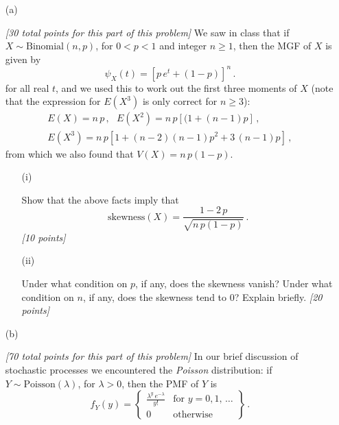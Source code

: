 \documentclass[12pt]{article}
\begin{document}
\begin{itemize}

\item[(a)]

\textit{[30 total points for this part of this problem]} We saw in class that if $X \sim \text{Binomial} ( n, p )$, for $0 < p < 1$ and integer $n \ge 1$, then the MGF of $X$ is given by
\begin{equation} \label{e:binomial-mgf-1}
\psi_X ( t ) = \left[ p \, e^t + ( 1 - p ) \right]^n \, .
\end{equation}
for all real $t$, and we used this to work out the first three moments of $X$ (note that the expression for $E \left( X^3 \right)$ is only correct for $n \ge 3$):
\begin{eqnarray} \label{e:binomial-mgf-2}
E ( X ) = n \, p \, , \ \ \ E \left( X^2 \right) = n \, p [ ( 1 + ( n - 1 ) p ] \, , \\ E \left( X^3 \right) = n \, p [ 1 + ( n - 2 ) ( n - 1 ) p^2 + 3 \, ( n - 1 ) p ] \, ,
\end{eqnarray}
from which we also found that $V ( X ) = n \, p ( 1 - p )$. 

\begin{itemize}

\item[(i)]%

Show that the above facts imply that
\begin{equation} \label{e:binomial-mgf-3}
\mbox{skewness} ( X ) = \frac{ 1 - 2 \, p }{ \sqrt{ n \, p ( 1 - p ) } } \, .
\end{equation}
\textit{[10 points]}

\item[(ii)]%

Under what condition on $p$, if any, does the skewness vanish? Under what condition on $n$, if any, does the skewness tend to 0? Explain briefly. \textit{[20 points]}

\end{itemize}

\item[(b)]

\textit{[70 total points for this part of this problem]} In our brief discussion of stochastic processes we encountered the \textit{Poisson} distribution: if $Y \sim \text{Poisson} ( \lambda )$, for $\lambda > 0$, then the PMF of $Y$ is
\begin{equation} \label{e:poisson-mgf-1}
f_Y ( y ) = \left\{ \begin{array}{cc} \frac{ \lambda^y \, e^{ - \lambda } }{ y ! } & \text{for } y = 0, 1, \, \dots \\ 0 & \text{otherwise} \end{array} \right\} \, .
\end{equation}


\end{itemize}
\end{document}
